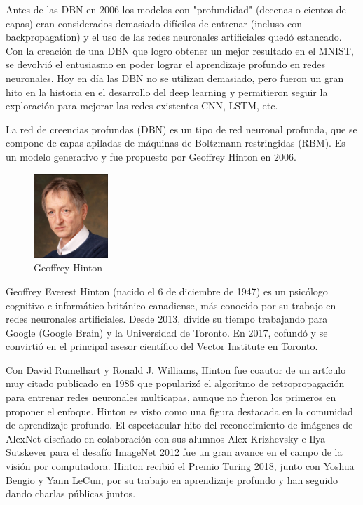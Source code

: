\documentclass[a4paper]{article}
\begin{document}
Antes de las DBN en 2006 los modelos con "profundidad" (decenas o 
cientos de capas) eran considerados demasiado difíciles de 
entrenar (incluso con backpropagation) y el uso de las redes 
neuronales artificiales quedó estancado. Con la creación de una 
DBN que logro obtener un mejor resultado en el MNIST, se devolvió 
el entusiasmo en poder lograr el aprendizaje profundo en redes 
neuronales. Hoy en día las DBN no se utilizan demasiado, pero 
fueron un gran hito en la historia en el desarrollo del deep 
learning y permitieron seguir la exploración para mejorar las 
redes existentes CNN, LSTM, etc.

La red de creencias profundas (DBN) es un tipo de red neuronal 
profunda, que se compone de capas apiladas de máquinas de 
Boltzmann restringidas (RBM). Es un modelo generativo y fue 
propuesto por Geoffrey Hinton en 2006.
\\
\begin{figure} %
    \centering
    \includegraphics[width=0.25\textwidth]{./images/Geoffrey_Hinton.jpeg}
    \caption{Geoffrey Hinton}
\end{figure}

Geoffrey Everest Hinton (nacido el 6 de diciembre de 1947) es un 
psicólogo cognitivo e informático británico-canadiense, más 
conocido por su trabajo en redes neuronales artificiales. Desde 
2013, divide su tiempo trabajando para Google (Google Brain) y la 
Universidad de Toronto. En 2017, cofundó y se convirtió en el 
principal asesor científico del Vector Institute en Toronto.

Con David Rumelhart y Ronald J. Williams, Hinton fue coautor de un 
artículo muy citado publicado en 1986 que popularizó el algoritmo 
de retropropagación para entrenar redes neuronales multicapas, 
aunque no fueron los primeros en proponer el enfoque. Hinton es 
visto como una figura destacada en la comunidad de aprendizaje 
profundo. El espectacular hito del reconocimiento de imágenes de 
AlexNet diseñado en colaboración con sus alumnos Alex Krizhevsky e 
Ilya Sutskever para el desafío ImageNet 2012 fue un gran avance en 
el campo de la visión por computadora.
Hinton recibió el Premio Turing 2018, junto con Yoshua Bengio y 
Yann LeCun, por su trabajo en aprendizaje profundo y han seguido 
dando charlas públicas juntos.
\end{document}
